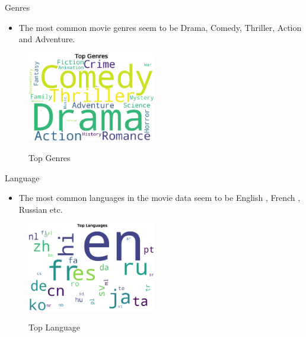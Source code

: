 \documentclass[
 size=14pt,
 paper=smartboard,  %
 mode=present, 		%
 display=slides, 	%
 style=tuliplab,  	%
 pauseslide,
 fleqn,leqno]{powerdot}
\begin{document}
\begin{slide}{Genres}
  \begin{itemize}
    \item The most common movie genres seem to be Drama, Comedy, Thriller, Action and Adventure.
  \end{itemize}
  \begin{figure}[htbp]
    \centering
    \includegraphics[width=0.5\textwidth]{figures//genre_clold.eps}\\
    \caption{Top Genres}
  \end{figure}
\end{slide}


\begin{slide}{Language}
  \begin{itemize}
    \item The most common languages in the movie data seem to be English , French , Russian  etc.
  \end{itemize}
  \begin{figure}[htbp]
    \centering
    \includegraphics[width=0.5\textwidth]{figures//language.eps}\\
    \caption{Top Language}
  \end{figure}
\end{slide}





\end{document}
